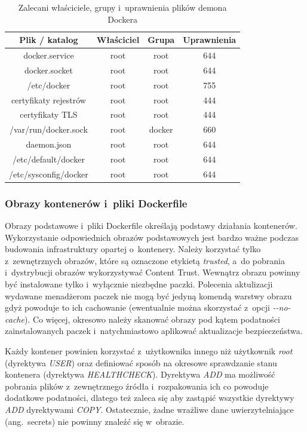 \begin{table}[ht]
    \centering
    \begin{tabular}{|c|c|c|c|}
        \hline
        \textbf{Plik / katalog} & \textbf{Właściciel} & \textbf{Grupa} & \textbf{Uprawnienia} \\
        \hline
        docker.service & root & root & 644 \\
        \hline
        docker.socket & root & root & 644 \\
        \hline
        /etc/docker & root & root & 755 \\
        \hline
        certyfikaty rejestrów & root & root & 444 \\
        \hline
        certyfikaty TLS & root & root & 444 \\
        \hline
        /var/run/docker.sock & root & docker & 660 \\
        \hline
        daemon.json & root & root & 644 \\
        \hline
        /etc/default/docker & root & root & 644 \\
        \hline
        /etc/sysconfig/docker & root & root & 644 \\
        \hline
    \end{tabular}
    \caption{Zalecani właściciele, grupy i~uprawnienia plików demona Dockera}
    \label{table:permissions}
\end{table}

\subsubsection{Obrazy kontenerów i~pliki Dockerfile}

Obrazy podstawowe i~pliki Dockerfile określają podstawy działania kontenerów. Wykorzystanie odpowiednich obrazów podstawowych jest bardzo ważne podczas budowania infrastruktury opartej o~kontenery. Należy korzystać tylko z~zewnętrznych obrazów, które są oznaczone etykietą \textit{trusted}, a~do pobrania i~dystrybucji obrazów wykorzystywać Content Trust. Wewnątrz obrazu powinny być instalowane tylko i~wyłącznie niezbędne paczki. Polecenia aktulizacji wydawane menadżerom paczek nie mogą być jedyną komendą warstwy obrazu gdyż powoduje to ich cachowanie (ewentualnie można skorzystać z~opcji \textit{-{}-no-cache}). Co więcej, okresowo należy skanować obrazy pod kątem podatności zainstalowanych paczek i~natychmiastowo aplikować aktualizacje bezpieczeństwa.

Każdy kontener powinien korzystać z~użytkownika innego niż użytkownik \textit{root} (dyrektywa \textit{USER}) oraz definiować sposób na okresowe sprawdzanie stanu kontenera (dyrektywa \textit{HEALTHCHECK}). Dyrektywa \textit{ADD} ma możliwość pobrania plików z~zewnętrznego źródła i~rozpakowania ich co powoduje dodatkowe podatności, dlatego też zaleca się aby zastąpić wszystkie dyrektywy \textit{ADD} dyrektywami \textit{COPY}. Ostatecznie, żadne wrażliwe dane uwierzytelniające (ang.~secrets) nie powinny znaleźć się w~obrazie.


